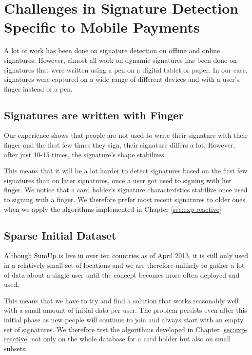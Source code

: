 \documentclass[a4paper, oneside]{csthesis}
\begin{document}
\section{Challenges in Signature Detection Specific to Mobile Payments}

A lot of work has been done on signature detection on offline and online signatures. However, almost all work on dynamic signatures has been done on signatures that were written using a pen on a digital tablet or paper. In our case, signatures were captured on a wide range of different devices and with a user's finger instead of a pen.

\subsection{Signatures are written with Finger}

Our experience shows that people are not used to write their signature with their finger and the first few times they sign, their signature differs a lot. However, after just 10-15 times, the signature's shape stabilizes.

This means that it will be a lot harder to detect signatures based on the first few signatures than on later signatures, once a user got used to signing with her finger.
We notice that a card holder's signature characteristics stabilize once used to signing with a finger. We therefore prefer most recent signatures to older ones when we apply the algorithms implemented in Chapter \ref{sec:exp-reactive}

\subsection{Sparse Initial Dataset}

Although SumUp is live in over ten countries as of April 2013, it is still only used in a relatively small set of locations and we are therefore unlikely to gather a lot of data about a single user until the concept becomes more often deployed and used.

This means that we have to try and find a solution that works reasonably well with a small amount of initial data per user. The problem persists even after this initial phase as new people will continue to join and always start with an empty set of signatures. We therefore test the algorithms developed in Chapter \ref{sec:exp-reactive} not only on the whole database for a card holder but also on small subsets.
\end{document}
